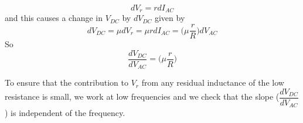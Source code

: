 \documentclass[%
 reprint,
nofootinbib,
 amsmath,amssymb,
 aps,
]{revtex4-2}
\begin{document}
            \begin{equation}
                d V_r = r d I_{AC}
            \end{equation}
            and this causes a change in $V_{DC}$ by $d V_{DC}$ given by
            \begin{equation}
                d V_{DC} = \mu d V_r = \mu r d I_{AC} = \Bigg( \mu \dfrac{r}{R} \Bigg) d V_{AC}
            \end{equation}
            So
            \begin{equation}
            \label{eq16}
                \dfrac{d V_{DC}}{d V_{AC}} = \Bigg( \mu \dfrac{r}{R} \Bigg) 
            \end{equation}
            \par
            To ensure that the contribution to $V_r$ from any residual inductance of the low resistance is small, we work at low frequencies and we check that the slope \Bigg($\dfrac{d V_{DC}}{d V_{AC}}$ \Bigg) is independent of the frequency. 
\end{document}
